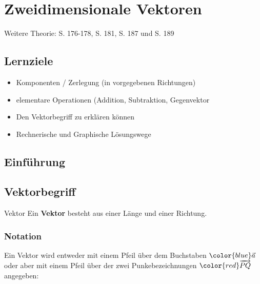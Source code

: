 
\section{Zweidimensionale Vektoren}

Weitere Theorie: S. 176-178, S. 181, S. 187 und S. 189

\subsection*{Lernziele}
\begin{itemize}
\item Komponenten / Zerlegung (in vorgegebenen Richtungen)
\item elementare Operationen (Addition, Subtraktion, Gegenvektor
\item Den Vektorbegriff zu erklären können
\item Rechnerische und Graphische Lösungswege
\end{itemize}
\newpage



\subsection{Einführung}

\subsection{Vektorbegriff}
\begin{definition}{Vektor}{}
  Ein \textbf{Vektor} besteht aus einer Länge und einer Richtung.
\end{definition}

\subsubsection{Notation}

Ein Vektor wird entweder mit einem Pfeil über dem Buchstaben
${\color{blue}\vec{a}}$ oder aber mit einem Pfeil über der zwei
Punkebezeichnungen ${\color{red}\overrightarrow{{PQ}}}$ angegeben:


